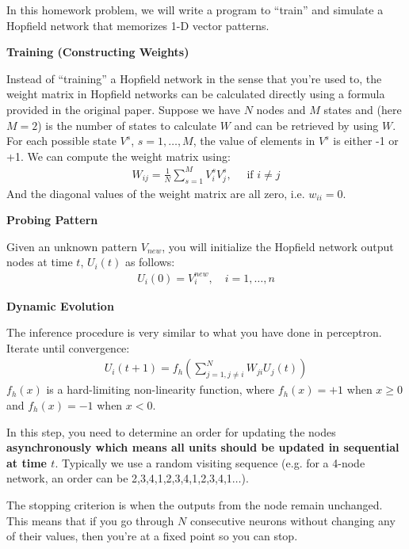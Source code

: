 \documentclass{article}
\begin{document}
\begin{probset}
\newpage

\begin{prob}
    In this homework problem, we will write a program to “train” and simulate a Hopfield network that memorizes 1-D vector patterns.

    \textbf{Training (Constructing Weights)}

    Instead of “training” a Hopfield network in the sense that you're used to, the weight matrix in Hopfield networks can be calculated directly using a formula provided in the original paper. Suppose we have $N$ nodes and $M$ states and (here $M = 2$) is the number of states to calculate $W$ and can be retrieved by using $W$. For each possible state $V^s$, $s = 1, \ldots, M$, the value of elements in $V^s$ is either -1 or +1. We can compute the weight matrix using:
    \begin{align}
        W_{ij} = \frac{1}{N} \sum_{s=1}^{M} V^s_i V^s_j, \quad \text{ if } i \neq j
    \end{align}
    And the diagonal values of the weight matrix are all zero, i.e. $w_{ii} = 0$.

    \textbf{Probing Pattern}

    Given an unknown pattern $V_{new}$, you will initialize the Hopfield network output nodes at time $t$, $U_i(t)$ as follows:
    \begin{align}
        U_i(0) = V^{new}_i, \quad i = 1, \ldots, n
    \end{align}
    
    \textbf{Dynamic Evolution}

    The inference procedure is very similar to what you have done in perceptron. Iterate until convergence:
    \begin{align}
        U_i(t + 1) = f_h\left(\sum_{j=1,j\neq i}^{N} W_{ji} U_j (t)\right)
    \end{align}
    $f_h(x)$ is a hard-limiting non-linearity function, where $f_h(x) = +1$ when $x \geq 0$ and $f_h(x) = -1$ when $x < 0$.

    In this step, you need to determine an order for updating the nodes \textbf{asynchronously which means all units should be updated in sequential at time $t$}. Typically we use a random visiting sequence (e.g. for a 4-node network, an order can be 2,3,4,1,2,3,4,1,2,3,4,1$\ldots$). 
    
    The stopping criterion is when the outputs from the node remain unchanged. This means that if you go through $N$ consecutive neurons without changing any of their values, then you're at a fixed point so you can stop.


\end{prob}
\end{probset}
\end{document}
